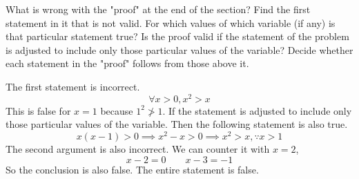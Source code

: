 \documentclass{exam}
\theoremstyle{mytheoremstyle}
\theoremstyle{mytheoremstyle}
\theoremstyle{myproblemstyle}
\begin{document}
\begin{questions}
    \question What is wrong with the "proof" at the end of the section? Find the first statement in it that is not valid. For which values of which variable (if any) is that particular statement true? Is the proof valid if the statement of the problem is adjusted to include only those particular values of the variable? Decide whether each statement in the "proof" follows from those above it.
    \begin{solution}
        The first statement is incorrect.
        \[\forall x>0, x^2>x\]
        This is false for \(x=1\) because \(1^2\ngtr 1\). If the statement is adjusted to include only those particular values of the variable. Then the following statement is also true.
        \[x(x-1)>0\implies x^2-x>0\implies x^2>x, \because x>1\]
        The second argument is also incorrect. We can counter it with \(x=2\),
        \[x-2=0 \qquad x-3=-1\]
        So the conclusion is also false. The entire statement is false.
    \end{solution}
\end{questions}
\end{document}
